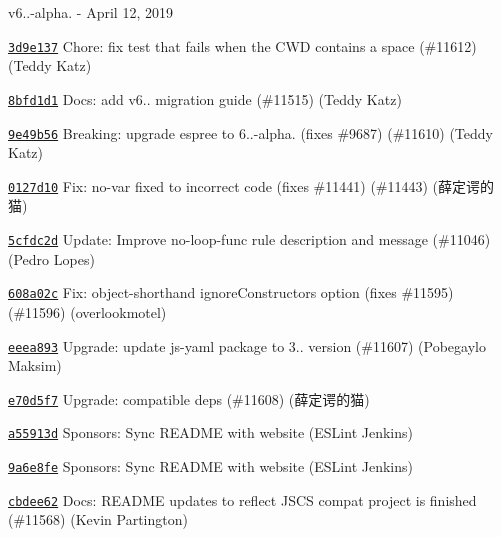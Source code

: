 v6..-\/alpha. -\/ April 12, 2019


\begin{DoxyItemize}
\item \href{https://github.com/eslint/eslint/commit/3d9e1372aad1e174b5438e3d6bd75fdefba06bad}{\texttt{ {\ttfamily 3d9e137}}} Chore\+: fix test that fails when the C\+WD contains a space (\#11612) (Teddy Katz)
\item \href{https://github.com/eslint/eslint/commit/8bfd1d138001d4493180b2fcff3330b42d0bb7cb}{\texttt{ {\ttfamily 8bfd1d1}}} Docs\+: add v6.. migration guide (\#11515) (Teddy Katz)
\item \href{https://github.com/eslint/eslint/commit/9e49b56c08fd0e449fddab45dfeb0da8d918b460}{\texttt{ {\ttfamily 9e49b56}}} Breaking\+: upgrade espree to 6..-\/alpha. (fixes \#9687) (\#11610) (Teddy Katz)
\item \href{https://github.com/eslint/eslint/commit/0127d107590acabfdea4a68b56acbeee6a7b9daa}{\texttt{ {\ttfamily 0127d10}}} Fix\+: no-\/var fixed to incorrect code (fixes \#11441) (\#11443) (薛定谔的猫)
\item \href{https://github.com/eslint/eslint/commit/5cfdc2d08307c63bec487e76d2f470ef84166867}{\texttt{ {\ttfamily 5cfdc2d}}} Update\+: Improve no-\/loop-\/func rule description and message (\#11046) (Pedro Lopes)
\item \href{https://github.com/eslint/eslint/commit/608a02c60656b96c3219d342eee7e98b55bdd580}{\texttt{ {\ttfamily 608a02c}}} Fix\+: object-\/shorthand ignore\+Constructors option (fixes \#11595) (\#11596) (overlookmotel)
\item \href{https://github.com/eslint/eslint/commit/eeea89361d48494995446ddb6ee6f049457911ec}{\texttt{ {\ttfamily eeea893}}} Upgrade\+: update js-\/yaml package to 3.. version (\#11607) (Pobegaylo Maksim)
\item \href{https://github.com/eslint/eslint/commit/e70d5f7573a9641d7b63394df53a3ef86183445c}{\texttt{ {\ttfamily e70d5f7}}} Upgrade\+: compatible deps (\#11608) (薛定谔的猫)
\item \href{https://github.com/eslint/eslint/commit/a55913d6c6fd1a7c684b8b4d7ab380cf7dc83eb8}{\texttt{ {\ttfamily a55913d}}} Sponsors\+: Sync R\+E\+A\+D\+ME with website (E\+S\+Lint Jenkins)
\item \href{https://github.com/eslint/eslint/commit/9a6e8fe4b025d52275f7ad2959361587f476cc58}{\texttt{ {\ttfamily 9a6e8fe}}} Sponsors\+: Sync R\+E\+A\+D\+ME with website (E\+S\+Lint Jenkins)
\item \href{https://github.com/eslint/eslint/commit/cbdee6230d22522c37259449467ace16f28ea8e8}{\texttt{ {\ttfamily cbdee62}}} Docs\+: R\+E\+A\+D\+ME updates to reflect J\+S\+CS compat project is finished (\#11568) (Kevin Partington)

\end{DoxyItemize}
